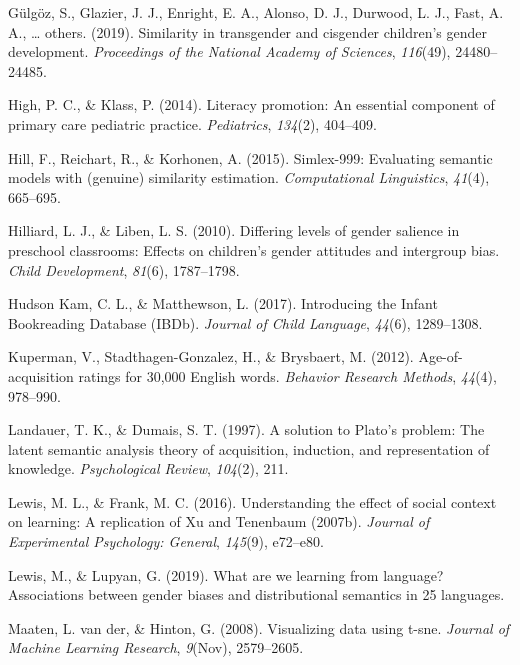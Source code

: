 \documentclass[english,,man,floatsintext]{apa6}
\begin{document}
\leavevmode\hypertarget{ref-gulgoz2019similarity}{}%
Gülgöz, S., Glazier, J. J., Enright, E. A., Alonso, D. J., Durwood, L. J., Fast, A. A., \ldots{} others. (2019). Similarity in transgender and cisgender children's gender development. \emph{Proceedings of the National Academy of Sciences}, \emph{116}(49), 24480--24485.

\leavevmode\hypertarget{ref-high2014literacy}{}%
High, P. C., \& Klass, P. (2014). Literacy promotion: An essential component of primary care pediatric practice. \emph{Pediatrics}, \emph{134}(2), 404--409.

\leavevmode\hypertarget{ref-hill2015simlex}{}%
Hill, F., Reichart, R., \& Korhonen, A. (2015). Simlex-999: Evaluating semantic models with (genuine) similarity estimation. \emph{Computational Linguistics}, \emph{41}(4), 665--695.

\leavevmode\hypertarget{ref-hilliard2010differing}{}%
Hilliard, L. J., \& Liben, L. S. (2010). Differing levels of gender salience in preschool classrooms: Effects on children's gender attitudes and intergroup bias. \emph{Child Development}, \emph{81}(6), 1787--1798.

\leavevmode\hypertarget{ref-kam_2017}{}%
Hudson Kam, C. L., \& Matthewson, L. (2017). Introducing the Infant Bookreading Database (IBDb). \emph{Journal of Child Language}, \emph{44}(6), 1289--1308.

\leavevmode\hypertarget{ref-kuperman2012age}{}%
Kuperman, V., Stadthagen-Gonzalez, H., \& Brysbaert, M. (2012). Age-of-acquisition ratings for 30,000 English words. \emph{Behavior Research Methods}, \emph{44}(4), 978--990.

\leavevmode\hypertarget{ref-landauer1997solution}{}%
Landauer, T. K., \& Dumais, S. T. (1997). A solution to Plato's problem: The latent semantic analysis theory of acquisition, induction, and representation of knowledge. \emph{Psychological Review}, \emph{104}(2), 211.

\leavevmode\hypertarget{ref-lewis2016understanding}{}%
Lewis, M. L., \& Frank, M. C. (2016). Understanding the effect of social context on learning: A replication of Xu and Tenenbaum (2007b). \emph{Journal of Experimental Psychology: General}, \emph{145}(9), e72--e80.

\leavevmode\hypertarget{ref-lewis2019we}{}%
Lewis, M., \& Lupyan, G. (2019). What are we learning from language? Associations between gender biases and distributional semantics in 25 languages.

\leavevmode\hypertarget{ref-maaten2008visualizing}{}%
Maaten, L. van der, \& Hinton, G. (2008). Visualizing data using t-sne. \emph{Journal of Machine Learning Research}, \emph{9}(Nov), 2579--2605.
\end{document}
